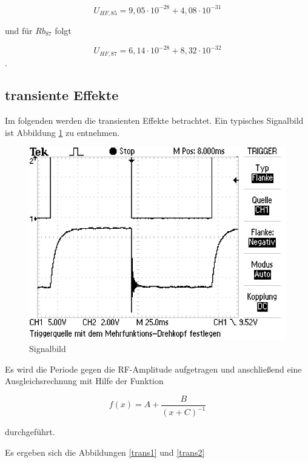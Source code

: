 \begin{equation}
U_{HF,85} = 9,05 \cdot 10^{-28} + 4,08 \cdot 10^{-31}
\end{equation}

und für $Rb_{87}$ folgt

\begin{equation}
U_{HF,87} = 6,14 \cdot 10^{-28} + 8,32 \cdot 10^{-32}
\end{equation}
.

\subsection{transiente Effekte}
Im folgenden werden die transienten Effekte betrachtet. Ein typisches Signalbild ist Abbildung \ref{sigPic} zu entnehmen.

\begin{figure}[h]
\centering
\includegraphics[scale=0.8]{img/TEK0019.JPG}
\caption{Signalbild}
\label{sigPic}
\end{figure}

Es wird die Periode gegen die RF-Amplitude aufgetragen und anschließend eine Ausgleichsrechnung mit Hilfe der Funktion

\begin{equation}
f(x) = A + \frac{B}{(x+C)^{-1}}
\end{equation}

durchgeführt.

Es ergeben sich die Abbildungen \ref{trans1} und \ref{trans2}

